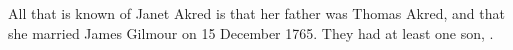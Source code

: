 
All that is known of Janet Akred is that her father was Thomas Akred, and that she married James Gilmour on 15 December 1765.
They had at least one son, .
